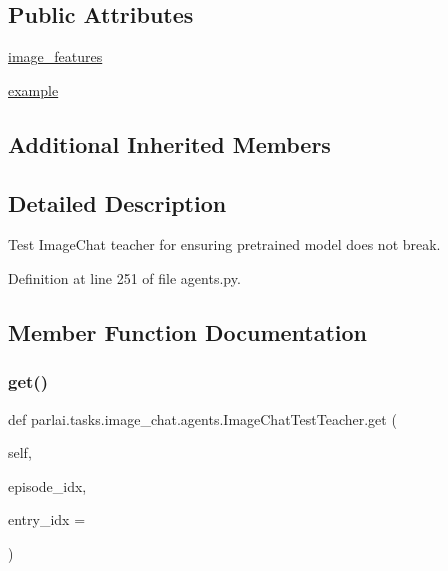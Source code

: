 \subsection*{Public Attributes}
\begin{DoxyCompactItemize}
\item 
\hyperlink{classparlai_1_1tasks_1_1image__chat_1_1agents_1_1ImageChatTestTeacher_a80425539c895043b514564eb38961bf6}{image\+\_\+features}
\item 
\hyperlink{classparlai_1_1tasks_1_1image__chat_1_1agents_1_1ImageChatTestTeacher_a7a723dab72ffcb3a7b39d0548fec9e79}{example}
\end{DoxyCompactItemize}
\subsection*{Additional Inherited Members}


\subsection{Detailed Description}
\begin{DoxyVerb}Test ImageChat teacher for ensuring pretrained model does not break.
\end{DoxyVerb}
 

Definition at line 251 of file agents.\+py.



\subsection{Member Function Documentation}
\mbox{\label{classparlai_1_1tasks_1_1image__chat_1_1agents_1_1ImageChatTestTeacher_a62eff78b8f32b86c39804a644c3337f6}} 
\subsubsection{\texorpdfstring{get()}{get()}}
{\footnotesize\ttfamily def parlai.\+tasks.\+image\+\_\+chat.\+agents.\+Image\+Chat\+Test\+Teacher.\+get (\begin{DoxyParamCaption}\item[{}]{self,  }\item[{}]{episode\+\_\+idx,  }\item[{}]{entry\+\_\+idx = {} }\end{DoxyParamCaption})}

